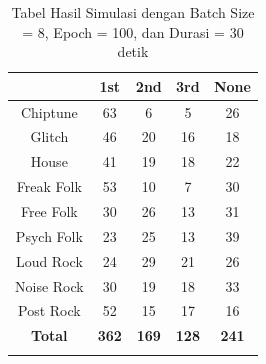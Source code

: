 \begin{longtable}[c]{|c|c|c|c|c|}
	\hline
	\textbf{}      & \textbf{1st} & \textbf{2nd} & \textbf{3rd} & \textbf{None} \\ \hline
	\endfirsthead
	\endhead
	Chiptune       & 63           & 6            & 5            & 26            \\ \hline
	Glitch         & 46           & 20           & 16           & 18            \\ \hline
	House          & 41           & 19           & 18           & 22            \\ \hline
	Freak Folk     & 53           & 10           & 7            & 30            \\ \hline
	Free Folk      & 30           & 26           & 13           & 31            \\ \hline
	Psych Folk     & 23           & 25           & 13           & 39            \\ \hline
	Loud Rock      & 24           & 29           & 21           & 26            \\ \hline
	Noise Rock     & 30           & 19           & 18           & 33            \\ \hline
	Post Rock      & 52           & 15           & 17           & 16            \\ \hline
	\textbf{Total} & \textbf{362} & \textbf{169} & \textbf{128} & \textbf{241}  \\ \hline
	\caption{Tabel Hasil Simulasi dengan Batch Size = 8, Epoch = 100, dan Durasi = 30 detik}
	\label{tab:my-table}\\
\end{longtable}

